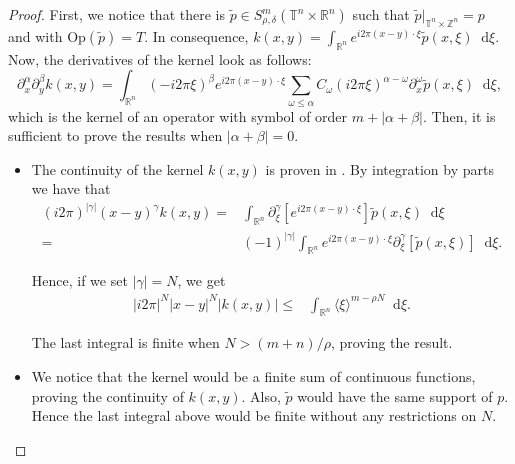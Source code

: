 \documentclass[12pt, reqno]{amsart}
\theoremstyle{definition}
\theoremstyle{remark}
\numberwithin{equation}{section}
\newcommand*\diff{\mathop{}\!\mathrm{d}}
\begin{document}
\begin{proof}
    First, we notice that there is $\tilde{p} \in S^m_{\rho, \delta}(\mathbb{T}^n \times \mathbb{R}^n)$ such that $\tilde{p}|_{\mathbb{T}^n \times \mathbb{Z}^n} = p$ and with $\mathrm{Op}(\tilde{p}) = T$. In consequence, $k(x, y) = \int_{\mathbb{R}^n} e^{i2\pi(x-y)\cdot \xi} \tilde{p}(x, \xi)\diff\xi $. Now, the derivatives of the kernel look as follows:
        \begin{equation}
            \partial^\alpha_x \partial^\beta_y k(x, y) = \int_{\mathbb{R}^n} (-i2\pi\xi)^\beta e^{i2\pi(x-y)\cdot \xi} \sum_{\omega \leq \alpha} C_\omega (i2\pi\xi)^{\alpha - \omega} \partial^\omega_x \tilde{p}(x, \xi) \diff\xi,
            \label{eq:derivative-kernel}
        \end{equation}
    which is the kernel of an operator with symbol of order $m + |\alpha + \beta|$. Then, it is sufficient to prove the results when $|\alpha + \beta| = 0$.

    \begin{itemize}
        \item[(a)] The continuity of the kernel $k(x, y)$ is proven in \cite[Theorem~4.3.6]{ruzhansky-turunen}. By integration by parts we have that
        \begin{align*}
            (i2\pi)^{|\gamma|}(x - y)^\gamma k(x, y) =& \int_{\mathbb{R}^n} \partial^\gamma_\xi \left[e^{i2\pi(x-y)\cdot \xi} \right]  \tilde{p}(x, \xi) \diff\xi \\
            = & (-1)^{|\gamma|} \int_{\mathbb{R}^n} e^{i2\pi(x-y)\cdot \xi} \partial^\gamma_\xi \left[\tilde{p}(x, \xi) \right] \diff\xi .
        \end{align*}

        Hence, if we set $|\gamma| = N$, we get
        \begin{align*}
            |i2\pi|^N|x-y|^N| k(x, y)| \leq & \int_{\mathbb{R}^n} \langle\xi\rangle^{m-\rho N} \diff \xi.
        \end{align*}

        The last integral is finite when $N > (m + n)/\rho$, proving the result.\\

        \item[(b)] We notice that the kernel would be a finite sum of continuous functions, proving the  continuity of $k(x, y)$. Also, $\tilde{p}$ would have the same support of $p$. Hence the last integral above would be finite without any restrictions on $N$.\\


\end{itemize}
\end{proof}
\end{document}
